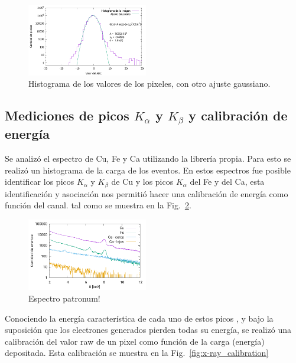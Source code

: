 \documentclass[twoside,twocolumn]{article}
\begin{document}
      \begin{figure}[h]
        \includegraphics[width=0.47\textwidth]{figures/background_histo_subs.pdf}
        \caption{Histograma de los valores de los pixeles, con otro ajuste gaussiano.}
        \label{fig:histogram_subs} %
      \end{figure}

    \subsection{Mediciones de picos $K_{\alpha}$ y $K_{\beta}$ y calibración de energía}\label{sec:results:peaks}
      Se analizó el espectro de Cu, Fe y Ca utilizando la librería propia.
      Para esto se realizó un histograma de la carga de los eventos.
      En estos espectros fue posible identificar los picos $K_{\alpha}$ y $K_{\beta}$ de Cu y los picos $K_{\alpha}$ del Fe y del Ca,
      esta identificación y asociación nos permitió hacer una calibración de energía como función del canal.
      tal como se muestra en la Fig.~\ref{fig:spectrum_x-ray}.

      \begin{figure}[h]
        \includegraphics[width=0.47\textwidth]{figures/x-ray_spectrum.pdf}
        \caption{Espectro patronum!} %
        \label{fig:spectrum_x-ray}
      \end{figure}

      Conociendo la energía característica de cada uno de estos picos \cite{thompson2016xray},
      y bajo la suposición que los electrones generados pierden todas su energía, %
      se realizó una calibración del valor raw de un pixel como función de la carga (energía) depositada.
      Esta calibración se muestra en la Fig.~\ref{fig:x-ray_calibration}
\end{document}
